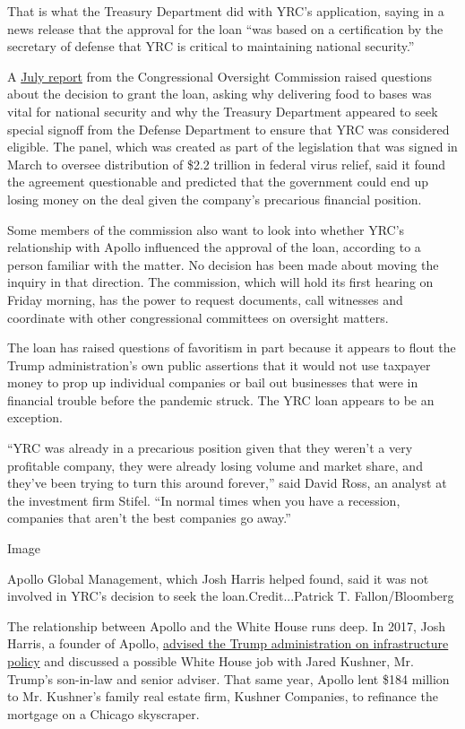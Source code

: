 That is what the Treasury Department did with YRC's application, saying
in a news release that the approval for the loan ``was based on a
certification by the secretary of defense that YRC is critical to
maintaining national security.''

A
\href{https://www.toomey.senate.gov/files/documents/Oversight\%20Commission\%20-\%203rd\%20Report\%20(FINAL)_7.20.20.pdf}{July
report} from the Congressional Oversight Commission raised questions
about the decision to grant the loan, asking why delivering food to
bases was vital for national security and why the Treasury Department
appeared to seek special signoff from the Defense Department to ensure
that YRC was considered eligible. The panel, which was created as part
of the legislation that was signed in March to oversee distribution of
\$2.2 trillion in federal virus relief, said it found the agreement
questionable and predicted that the government could end up losing money
on the deal given the company's precarious financial position.

Some members of the commission also want to look into whether YRC's
relationship with Apollo influenced the approval of the loan, according
to a person familiar with the matter. No decision has been made about
moving the inquiry in that direction. The commission, which will hold
its first hearing on Friday morning, has the power to request documents,
call witnesses and coordinate with other congressional committees on
oversight matters.

The loan has raised questions of favoritism in part because it appears
to flout the Trump administration's own public assertions that it would
not use taxpayer money to prop up individual companies or bail out
businesses that were in financial trouble before the pandemic struck.
The YRC loan appears to be an exception.

``YRC was already in a precarious position given that they weren't a
very profitable company, they were already losing volume and market
share, and they've been trying to turn this around forever,'' said David
Ross, an analyst at the investment firm Stifel. ``In normal times when
you have a recession, companies that aren't the best companies go
away.''

Image

Apollo Global Management, which Josh Harris helped found, said it was
not involved in YRC's decision to seek the loan.Credit...Patrick T.
Fallon/Bloomberg

The relationship between Apollo and the White House runs deep. In 2017,
Josh Harris, a founder of Apollo,
\href{https://www.nytimes3xbfgragh.onion/2018/02/28/business/jared-kushner-apollo-citigroup-loans.html}{advised
the Trump administration on infrastructure policy} and discussed a
possible White House job with Jared Kushner, Mr. Trump's son-in-law and
senior adviser. That same year, Apollo lent \$184 million to Mr.
Kushner's family real estate firm, Kushner Companies, to refinance the
mortgage on a Chicago skyscraper.

